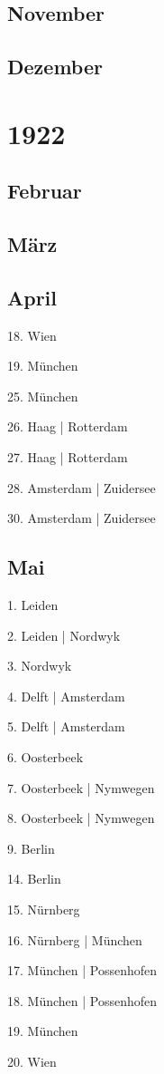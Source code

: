 \documentclass[twoside=false,titlepage=false,open=any, parskip=never, fontsize=10pt, headings=small, chapterprefix=false, appendixprefix=false, DIV=15]{scrbook}
\begin{document}
\begin{multicols}{3}
            \section*{November}
            \section*{Dezember}
            \chapter*{1922}
            \section*{Februar}
            \section*{März}
            \section*{April}
            18. Wien\par
            19. München\par
            25. München\par
            26. Haag | Rotterdam\par
            27. Haag | Rotterdam\par
            28. Amsterdam | Zuidersee\par
            30. Amsterdam | Zuidersee\par
            \section*{Mai}
            1. Leiden\par
            2. Leiden | Nordwyk\par
            3. Nordwyk\par
            4. Delft | Amsterdam\par
            5. Delft | Amsterdam\par
            6. Oosterbeek\par
            7. Oosterbeek | Nymwegen\par
            8. Oosterbeek | Nymwegen\par
            9. Berlin\par
            14. Berlin\par
            15. Nürnberg\par
            16. Nürnberg | München\par
            17. München | Possenhofen\par
            18. München | Possenhofen\par
            19. München\par
            20. Wien\par

\end{multicols}
\end{document}
